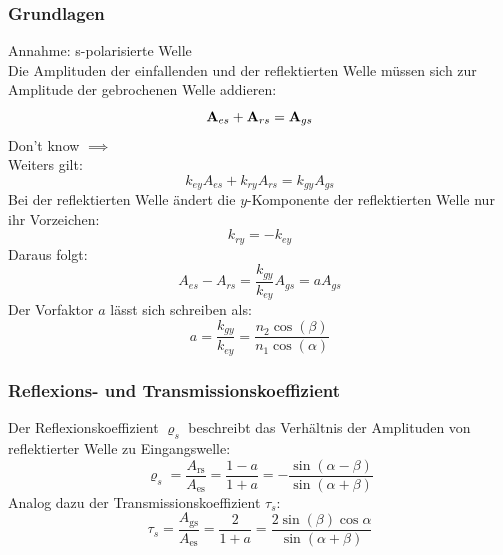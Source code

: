 \documentclass[a4paper, 11pt, ngerman, parskip=half-]{scrartcl}
\begin{document}
\subsubsection*{Grundlagen}
%
Annahme: s-polarisierte Welle\\
Die Amplituden der einfallenden und der reflektierten Welle müssen
sich zur Amplitude der gebrochenen Welle addieren:
%
\begin{equation}
	\vb{A}_{es} + \vb{A}_{rs} = \vb{A}_{gs}
\end{equation}
%
Don't know $\implies$ \\
Weiters gilt:
%
\begin{equation}
	k_{ey} A_{es} + k_{ry} A_{rs} = k_{gy} A_{gs}
\end{equation}
%
Bei der reflektierten Welle ändert die $y$-Komponente der reflektierten
Welle nur ihr Vorzeichen:
%
\begin{equation}
	k_{ry} = -k_{ey}
\end{equation}
%
Daraus folgt:
%
\begin{equation}
	A_{es} - A_{rs} = \frac{k_{gy}}{k_{ey}} A_{gs} = a A_{gs}
\end{equation}
%
Der Vorfaktor $a$ lässt sich schreiben als:
%
\begin{equation}
	a = \frac{k_{gy}}{k_{ey}} = \frac{n_2 \cos(\beta)}{n_1 \cos(\alpha)}
\end{equation}
%
\subsubsection*{Reflexions- und Transmissionskoeffizient}
%
Der Reflexionskoeffizient $\varrho_s$ beschreibt das Verhältnis der Amplituden von reflektierter Welle zu Eingangswelle:
%
\begin{equation}
    \label{eq:reflexionskoeffizient}
    \varrho_s = \frac{A_{\text{rs}}}{A_{\text{es}}} = \frac{1-a}{1+a} = -\frac{\sin(\alpha - \beta)}{\sin(\alpha + \beta)}
\end{equation}
%
Analog dazu der Transmissionskoeffizient $\tau_s$:
%
\begin{equation}
    \label{eq:transmissionskoeffizient}
    \tau_s = \frac{A_{\text{gs}}}{A_{\text{es}}} = \frac{2}{1+a} = \frac{2 \sin (\beta) \cos{\alpha}}{\sin (\alpha + \beta)}
\end{equation}
%
\end{document}
